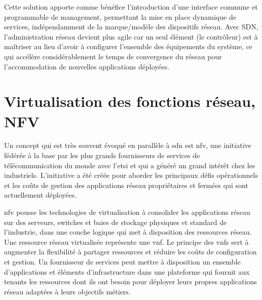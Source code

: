 
Cette solution apporte comme bénéfice l'introduction d'une interface commune et programmable de management, permettant la mise en place dynamique de services, indépendamment de la marque/modèle des dispositifs réseau. Avec SDN, l'administration réseau devient plus agile car un seul élément (le contrôleur) est à maîtriser au lieu d'avoir à configurer l'ensemble des équipements du système, ce qui accélère considérablement le temps de convergence du réseau pour l'accommodation de nouvelles applications déployées. \cite{SDNNewNormONFExecutiveSummary} \cite{ImplementationChallengesForSDNBackground}





\section{Virtualisation des fonctions réseau, NFV}


Un concept qui est très souvent évoqué en parallèle à \gls{sdn} est \gls{nfv}, une initiative fédérée à la base par les plus grands fournisseurs de services  de télécommunication du monde avec l'\gls{etsi} et qui a généré un grand intérêt chez les industriels. L'initiative a été créée pour aborder les principaux défis opérationnels et les coûts de gestion des applications réseau propriétaires et fermées qui sont actuellement déployées.


\gls{nfv} pousse les technologies de virtualisation à consolider les applications réseau sur des serveurs, switches et baies de stockage physiques et standard de l'industrie, dans une couche logique qui met à disposition des ressources réseau. Une ressource réseau virtualisée représente une \gls{vnf}. Le principe des \glspl{vnf} sert à augmenter la flexibilité à partager ressources et réduire les coûts de configuration et gestion. Un fournisseur de services peut mettre à disposition un ensemble d'applications et éléments d'infrastructure dans une plateforme qui fournit aux tenants les ressources dont ils ont besoin pour déployer leurs propres applications réseau adaptées à leurs objectifs métiers.


